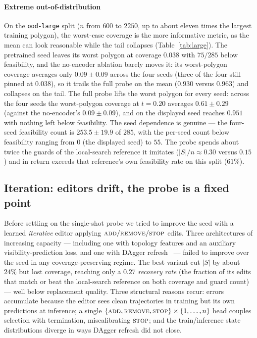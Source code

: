 \documentclass[preprint,10pt]{elsarticle}
\begin{document}
\paragraph{Extreme out-of-distribution} On the \texttt{ood-large} split ($n$ from $600$ to $2250$, up to about eleven times the largest training polygon), the worst-case coverage is the more informative metric, as the mean can look reasonable while the tail collapses (Table~\ref{tab:large}). The pretrained seed leaves its worst polygon at coverage $0.038$ with $75/285$ below feasibility, and the no-encoder ablation barely moves it: its worst-polygon coverage averages only $0.09 \pm 0.09$ across the four seeds (three of the four still pinned at $0.038$), so it trails the full probe on the mean ($0.930$ versus $0.963$) and collapses on the tail. The full probe lifts the worst polygon for every seed: across the four seeds the worst-polygon coverage at $t = 0.20$ averages $0.61 \pm 0.29$ (against the no-encoder's $0.09 \pm 0.09$), and on the displayed seed reaches $0.951$ with nothing left below feasibility. The seed dependence is genuine --- the four-seed feasibility count is $253.5 \pm 19.9$ of $285$, with the per-seed count below feasibility ranging from $0$ (the displayed seed) to $55$. The probe spends about twice the guards of the local-search reference it imitates ($|S|/n \approx 0.30$ versus $0.15$) and in return exceeds that reference's own feasibility rate on this split ($61\%$).

\subsection{Iteration: editors drift, the probe is a fixed point}
\label{sec:res-iteration}

Before settling on the single-shot probe we tried to improve the seed with a learned \emph{iterative} editor applying $\textsc{add}/\textsc{remove}/\textsc{stop}$ edits. Three architectures of increasing capacity --- including one with topology features and an auxiliary visibility-prediction loss, and one with DAgger refresh~\cite{RossGordonBagnell2011DAgger} --- failed to improve over the seed in any coverage-preserving regime. The best variant cut $|S|$ by about $24\%$ but lost coverage, reaching only a $0.27$ \emph{recovery rate} (the fraction of its edits that match or beat the local-search reference on both coverage and guard count) --- well below replacement quality. Three structural reasons recur: errors accumulate because the editor sees clean trajectories in training but its own predictions at inference; a single $\{\textsc{add},\textsc{remove},\textsc{stop}\}\times\{1,\dots,n\}$ head couples selection with termination, miscalibrating $\textsc{stop}$; and the train/inference state distributions diverge in ways DAgger refresh did not close.
\end{document}
